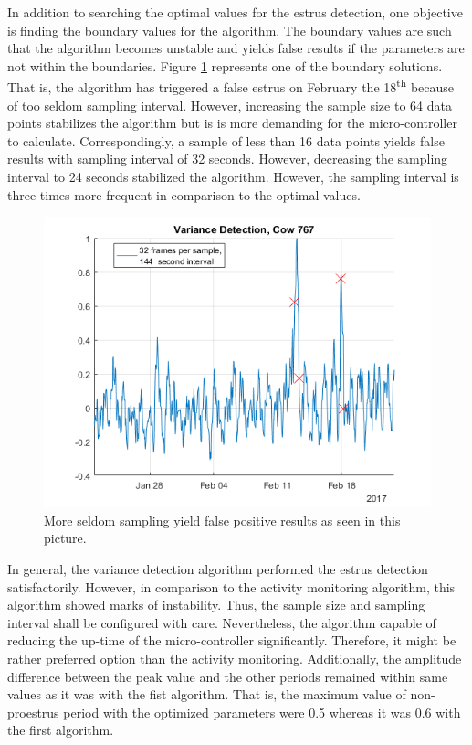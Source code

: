 \documentclass[english,12pt,a4paper,pdftex,elec,utf8]{aaltothesis}
\begin{document}
In addition to searching the optimal values for the estrus detection, one objective is finding the boundary values for the algorithm. The boundary values are such that the algorithm becomes unstable and yields false results if the parameters are not within the boundaries. Figure \ref{VarianceDetectionCow767_32frames144seconds} represents one of the boundary solutions. That is, the algorithm has triggered a false estrus on February the 18\textsuperscript{th} because of too seldom sampling interval. However, increasing the sample size to 64 data points stabilizes the algorithm but is is more demanding for the micro-controller to calculate. Correspondingly, a sample of less than 16 data points yields false results with sampling interval of 32 seconds. However, decreasing the sampling interval to 24 seconds stabilized the algorithm. However, the sampling interval is three times more frequent in comparison to the optimal values.


\begin{figure}[htb]
\centering
\includegraphics[width = 0.75 \textwidth]{figures/VarianceDetectionCow767_32frames144seconds.png}
\caption{More seldom sampling yield false positive results as seen in this picture.}
\label{VarianceDetectionCow767_32frames144seconds}
\end{figure}

In general, the variance detection algorithm performed the estrus detection satisfactorily. However, in comparison to the activity monitoring algorithm, this algorithm showed marks of instability. Thus, the sample size and sampling interval shall be configured with care. Nevertheless, the algorithm capable of reducing the up-time of the micro-controller significantly. Therefore, it might be rather preferred option than the activity monitoring. Additionally, the amplitude difference between the peak value and the other periods remained within same values as it was with the fist algorithm. That is, the maximum value of non-proestrus period with the optimized parameters were 0.5 whereas it was 0.6 with the first algorithm.
\end{document}
